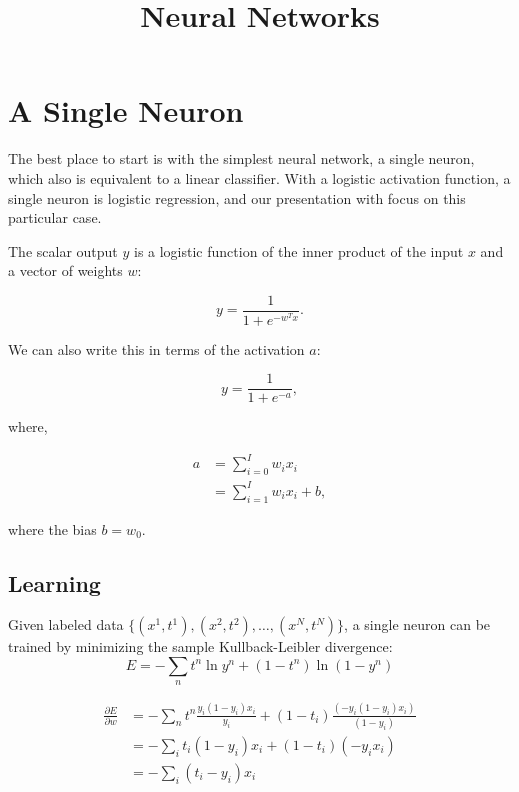 \documentclass{article}
\begin{document}
\title{Neural Networks}
\author{}
\date{}
\maketitle

\section{A Single Neuron}

The best place to start is with the simplest neural network, a single neuron, which also is equivalent to a linear classifier.  With a logistic activation function, a single neuron is logistic regression, and our presentation with focus on this particular case.

The scalar output $y$ is a logistic function of the inner product of the input $x$ and a vector of weights $w$:

\begin{equation}
y = \frac{1}{1 + e^{-w^T x}}.
\end{equation}

We can also write this in terms of the activation $a$:

\begin{equation}
y = \frac{1}{1 + e^{-a}},
\end{equation}

where,

\begin{align}
a &= \sum_{i = 0}^I w_i x_i \\
&= \sum_{i = 1}^I w_i x_i + b,
\end{align}

where the bias $b = w_0$.

\subsection{Learning}

Given labeled data $\{(x^1, t^1), (x^2, t^2), \ldots, (x^N, t^N)\}$, a single neuron can be trained by minimizing the sample Kullback-Leibler divergence:
\begin{equation}
E = - \sum_n t^n \ln y^n + (1 - t^n) \ln (1 - y^n) 
\end{equation}

\begin{align}
\frac{\partial E}{\partial w} &= - \sum_n t^n \frac{y_i (1 - y_i) x_i}{y_i} + (1 - t_i) \frac{(-y_i (1 - y_i) x_i)}{ (1 - y_i)} \\
&= - \sum_i t_i (1 - y_i) x_i + (1 - t_i) (-y_i x_i) \\
&= - \sum_i (t_i - y_i) x_i
\end{align}
\end{document}
